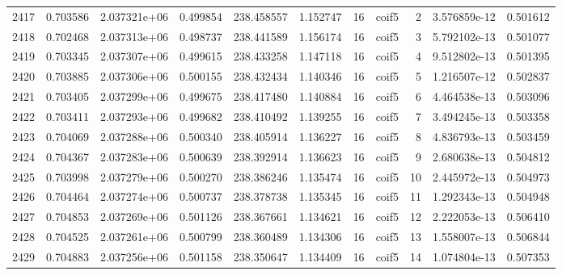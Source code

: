 \begin{tabular}{lrrrrrrlrrr}
2417 &    0.703586 &        2.037321e+06 &  0.499854 &              238.458557 &    1.152747 &      16 &        coif5 &      2 &   3.576859e-12 &      0.501612 \\
2418 &    0.702468 &        2.037313e+06 &  0.498737 &              238.441589 &    1.156174 &      16 &        coif5 &      3 &   5.792102e-13 &      0.501077 \\
2419 &    0.703345 &        2.037307e+06 &  0.499615 &              238.433258 &    1.147118 &      16 &        coif5 &      4 &   9.512802e-13 &      0.501395 \\
2420 &    0.703885 &        2.037306e+06 &  0.500155 &              238.432434 &    1.140346 &      16 &        coif5 &      5 &   1.216507e-12 &      0.502837 \\
2421 &    0.703405 &        2.037299e+06 &  0.499675 &              238.417480 &    1.140884 &      16 &        coif5 &      6 &   4.464538e-13 &      0.503096 \\
2422 &    0.703411 &        2.037293e+06 &  0.499682 &              238.410492 &    1.139255 &      16 &        coif5 &      7 &   3.494245e-13 &      0.503358 \\
2423 &    0.704069 &        2.037288e+06 &  0.500340 &              238.405914 &    1.136227 &      16 &        coif5 &      8 &   4.836793e-13 &      0.503459 \\
2424 &    0.704367 &        2.037283e+06 &  0.500639 &              238.392914 &    1.136623 &      16 &        coif5 &      9 &   2.680638e-13 &      0.504812 \\
2425 &    0.703998 &        2.037279e+06 &  0.500270 &              238.386246 &    1.135474 &      16 &        coif5 &     10 &   2.445972e-13 &      0.504973 \\
2426 &    0.704464 &        2.037274e+06 &  0.500737 &              238.378738 &    1.135345 &      16 &        coif5 &     11 &   1.292343e-13 &      0.504948 \\
2427 &    0.704853 &        2.037269e+06 &  0.501126 &              238.367661 &    1.134621 &      16 &        coif5 &     12 &   2.222053e-13 &      0.506410 \\
2428 &    0.704525 &        2.037261e+06 &  0.500799 &              238.360489 &    1.134306 &      16 &        coif5 &     13 &   1.558007e-13 &      0.506844 \\
2429 &    0.704883 &        2.037256e+06 &  0.501158 &              238.350647 &    1.134409 &      16 &        coif5 &     14 &   1.074804e-13 &      0.507353 \\

\end{tabular}
